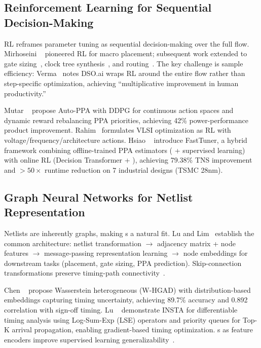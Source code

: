 \documentclass[10pt,conference]{IEEEtran}
\newcommand{\PPO}{\text{PPO}}
\newcommand{\GNN}{\text{GNN}}
\begin{document}
\subsection{Reinforcement Learning for Sequential Decision-Making}
\label{sec:rl_sequential}

RL reframes parameter tuning as sequential decision-making over the full flow. Mirhoseini \etal~\cite{mirhoseini2020chip} pioneered RL for macro placement; subsequent work extended to gate sizing~\cite{lu2021rl}, clock tree synthesis~\cite{lu2022advancing}, and routing~\cite{lu2024solvers}. The key challenge is sample efficiency: Verma~\cite{verma2024dso} notes DSO.ai wraps RL around the entire flow rather than step-specific optimization, achieving ``multiplicative improvement in human productivity.''

Mutar \etal~\cite{mutar2026auto} propose Auto-PPA with DDPG for continuous action spaces and dynamic reward rebalancing PPA priorities, achieving 42\% power-performance product improvement. Rahim~\cite{rahim2026machine} formulates VLSI optimization as RL with voltage/frequency/architecture actions. Hsiao \etal~\cite{hsiao2026fasttuner} introduce FastTuner, a hybrid framework combining offline-trained PPA estimators (\GNN{} + supervised learning) with online RL (Decision Transformer + \PPO{}), achieving 79.38\% TNS improvement and $>50\times$ runtime reduction on 7 industrial designs (TSMC 28nm).

\subsection{Graph Neural Networks for Netlist Representation}
\label{sec:gnn_netlist}

Netlists are inherently graphs, making \GNN{}s a natural fit. Lu and Lim~\cite{lu2022advancing} establish the common \GNN{} architecture: netlist transformation $\rightarrow$ adjacency matrix + node features $\rightarrow$ message-passing representation learning $\rightarrow$ node embeddings for downstream tasks (placement, gate sizing, PPA prediction). Skip-connection transformations preserve timing-path connectivity~\cite{lu2022advancing}.

Chen \etal~\cite{chen2025graph} propose Wasserstein heterogeneous \GNN{} (W-HGAD) with distribution-based embeddings capturing timing uncertainty, achieving 89.7\% accuracy and 0.892 correlation with sign-off timing. Lu \etal~\cite{lu2023insta} demonstrate INSTA for differentiable timing analysis using Log-Sum-Exp (LSE) operators and priority queues for Top-K arrival propagation, enabling gradient-based timing optimization. \GNN{}s as feature encoders improve supervised learning generalizability~\cite{lu2022advancing,hsiao2026fasttuner}.
\end{document}
